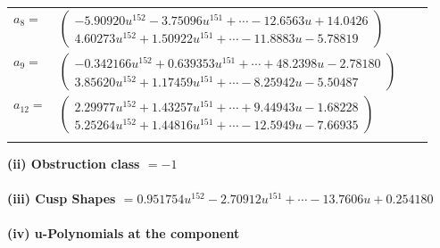 \documentclass[1p]{elsarticle_modified}
\theoremstyle{definition}
\begin{document}
\begin{tabular}{m{7pt} m{180pt} m{7pt} m{180pt} }
\flushright $a_{8}=$&$\begin{pmatrix}-5.90920 u^{152}-3.75096 u^{151}+\cdots-12.6563 u+14.0426\\4.60273 u^{152}+1.50922 u^{151}+\cdots-11.8883 u-5.78819\end{pmatrix}$ \\
\flushright $a_{9}=$&$\begin{pmatrix}-0.342166 u^{152}+0.639353 u^{151}+\cdots+48.2398 u-2.78180\\3.85620 u^{152}+1.17459 u^{151}+\cdots-8.25942 u-5.50487\end{pmatrix}$ \\
\flushright $a_{12}=$&$\begin{pmatrix}2.29977 u^{152}+1.43257 u^{151}+\cdots+9.44943 u-1.68228\\5.25264 u^{152}+1.44816 u^{151}+\cdots-12.5949 u-7.66935\end{pmatrix}$\\&\end{tabular}
\flushleft \textbf{(ii) Obstruction class $= -1$}\\~\\
\flushleft \textbf{(iii) Cusp Shapes $= 0.951754 u^{152}-2.70912 u^{151}+\cdots-13.7606 u+0.254180$}\\~\\
\newpage\renewcommand{\arraystretch}{1}
\flushleft \textbf{(iv) u-Polynomials at the component}\newline \\
\end{document}
